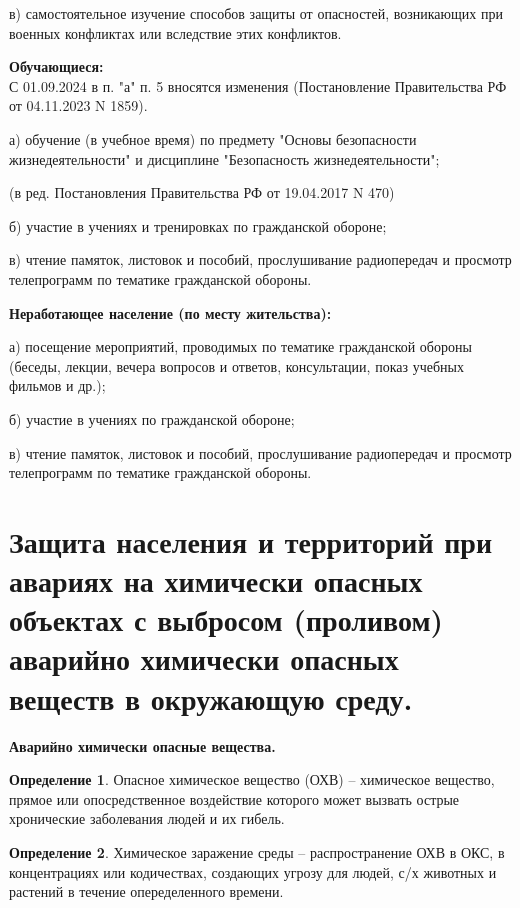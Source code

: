 \documentclass[a4paper, 12pt]{article}
\theoremstyle{definition}
\newtheorem*{definition}{Определение}
\begin{document}
        в) самостоятельное изучение способов защиты от опасностей, возникающих при военных конфликтах или вследствие этих конфликтов.

        \textbf{Обучающиеся:}\\
        С 01.09.2024 в п. "а" п. 5 вносятся изменения (Постановление Правительства РФ от 04.11.2023 N 1859).

        а) обучение (в учебное время) по предмету "Основы безопасности жизнедеятельности" и дисциплине "Безопасность жизнедеятельности";

        (в ред. Постановления Правительства РФ от 19.04.2017 N 470)

        б) участие в учениях и тренировках по гражданской обороне;

        в) чтение памяток, листовок и пособий, прослушивание радиопередач и просмотр телепрограмм по тематике гражданской обороны.

        \textbf{Неработающее население (по месту жительства):}

        а) посещение мероприятий, проводимых по тематике гражданской обороны (беседы, лекции, вечера вопросов и ответов, консультации, показ учебных фильмов и др.);

        б) участие в учениях по гражданской обороне;

        в) чтение памяток, листовок и пособий, прослушивание радиопередач и просмотр телепрограмм по тематике гражданской обороны.

        \section{Защита населения и территорий при авариях на химически опасных объектах с выбросом (проливом) аварийно химически опасных веществ в окружающую среду.}

        \begin{center}
            \textbf{Аварийно химически опасные вещества.} 
        \end{center}
        \begin{definition}
            Опасное химическое вещество (ОХВ) -- химическое вещество, прямое или опосредственное воздействие которого может вызвать острые хронические заболевания людей и их гибель.
        \end{definition}

        \begin{definition}
            Химическое заражение среды -- распространение ОХВ в ОКС, в концентрациях или кодичествах, создающих угрозу для людей, с/х животных и растений в течение опеределенного времени.
        \end{definition}
\end{document}
